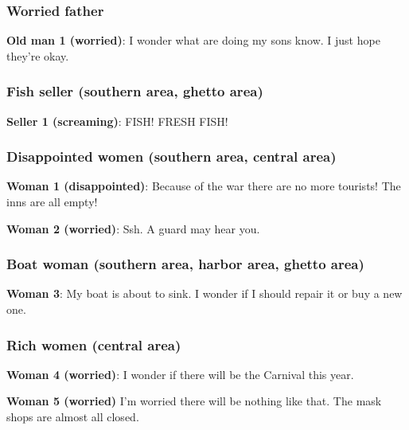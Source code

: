 \subsubsection*{Worried father}
\textbf{Old man 1 (worried)}: I wonder what are doing my sons know. I just hope they're okay.

\subsubsection*{Fish seller (southern area, ghetto area)}
\textbf{Seller 1 (screaming)}: FISH! FRESH FISH!

\subsubsection*{Disappointed women (southern area, central area)}
\textbf{Woman 1 (disappointed)}: Because of the war there are no more tourists! The inns are all empty!

\textbf{Woman 2 (worried)}: Ssh. A guard may hear you.

\subsubsection*{Boat woman (southern area, harbor area, ghetto area)}
\textbf{Woman 3}: My boat is about to sink. I wonder if I should repair it or buy a new one.

\subsubsection*{Rich women (central area)}
\textbf{Woman 4 (worried)}: I wonder if there will be the Carnival this year.

\textbf{Woman 5 (worried)} I'm worried there will be nothing like that. The mask shops are almost all closed.
